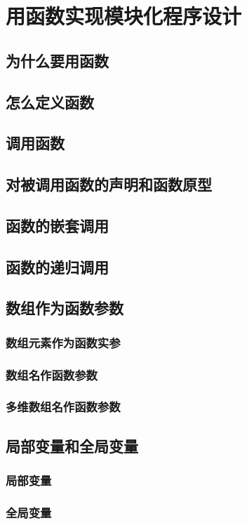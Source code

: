 \chapter{用函数实现模块化程序设计}
\section{为什么要用函数}
\section{怎么定义函数}
\section{调用函数}
\section{对被调用函数的声明和函数原型}
\section{函数的嵌套调用}
\section{函数的递归调用}
\section{数组作为函数参数}
\subsection{数组元素作为函数实参}
\subsection{数组名作函数参数}
\subsection{多维数组名作函数参数}
\section{局部变量和全局变量}
\subsection{局部变量}
\subsection{全局变量}
